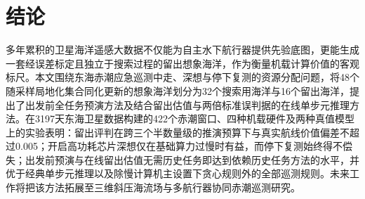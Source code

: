 \section{结论}

多年累积的卫星海洋遥感大数据不仅能为自主水下航行器提供先验底图，更能生成一套经误差标定且独立于搜索过程的留出想象海洋，作为衡量机载计算价值的客观标尺。本文围绕东海赤潮应急巡测中走、深想与停下复测的资源分配问题，将48个随采样局地化集合同化更新的想象海洋划分为32个搜索用海洋与16个留出海洋，提出了出发前全任务预演方法及结合留出估值与两倍标准误判据的在线单步元推理方法。在3197天东海卫星数据构建的422个赤潮窗口、四种机载硬件及两种真值模型上的实验表明：留出评判在跨三个半数量级的推演预算下与真实航线价值偏差不超过0.005；开启高功耗芯片深想仅在基础算力过慢时有益，而停下复测始终得不偿失；出发前预演与在线留出估值无需历史任务即达到依赖历史任务方法的水平，并优于经典单步元推理以及除慢计算机主设置下贪心规则外的全部巡测规则。未来工作将把该方法拓展至三维斜压海流场与多航行器协同赤潮巡测研究。
